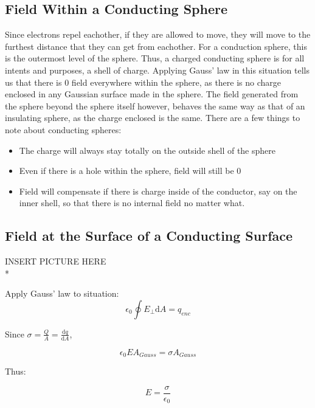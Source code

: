 \documentclass[a4paper,12pt]{article}
\begin{document}
				\subsection{Field Within a Conducting Sphere}
						Since electrons repel eachother, if they are allowed to move, they will move to the furthest distance that they can get from eachother. For a conduction sphere, this is the outermost level of the sphere. Thus, a charged conducting sphere is for all intents and purposes, a shell of charge. Applying Gauss' law in this situation tells us that there is 0 field everywhere within the sphere, as there is no charge enclosed in any Gaussian surface made in the sphere. The field generated from the sphere beyond the sphere itself however, behaves the same way as that of an insulating sphere, as the charge enclosed is the same. 
						There are a few things to note about conducting spheres:
						\begin{itemize}
								\item The charge will always stay totally on the outside shell of the sphere
								\item Even if there is a hole within the sphere, field will still be 0
								\item Field will compensate if there is charge inside of the conductor, say on the inner shell, so that there is no internal field no matter what. 
						\end{itemize}
				\setcounter{subsubsection}{0}
				\subsection{Field at the Surface of a Conducting Surface}
					INSERT PICTURE HERE\\*
					
					Apply Gauss' law to situation:
					\begin{equation*}
							\epsilon_{0} \oint E_{\bot} \mathrm{d}A = q_{enc}
					\end{equation*}

					Since $\sigma= \frac{Q}{A} = \frac{\mathrm{d}q}{\mathrm{d}A}$,

					\begin{equation*}
							\epsilon_{0}E A_{Gauss} = \sigma A_{Gauss}
					\end{equation*}

					Thus:

					\begin{equation*}
							E = \frac{\sigma}{\epsilon_{0}}
					\end{equation*}
\end{document}
